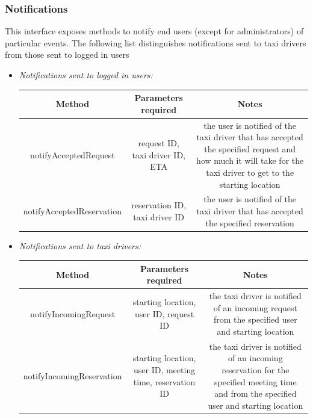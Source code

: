\documentclass{article}
\begin{document}
\begin{itemize}
\subsubsection{Notifications}
This interface exposes methods to notify end users (except for administrators) of particular events. 
The following list distinguishes notifications sent to taxi drivers from those sent to logged in users
\begin{itemize}
	\item \textit{Notifications sent to logged in users:} \\
		\begin{adjustbox}{width=1.2\textwidth}	
			\begin{tabular}{*{3}{c}}
				\toprule
				Method & Parameters required & Notes \\
				\midrule
				notifyAcceptedRequest & request ID, taxi driver ID, ETA & the user is notified of the taxi driver that has accepted the specified request and how much it will take for the taxi driver to get to the starting location\\ 
				notifyAcceptedReservation & reservation ID, taxi driver ID & the user is notified of the taxi driver that has accepted the specified reservation \\
				\bottomrule
			\end{tabular}
		\end{adjustbox}	
	\item \textit{Notifications sent to taxi drivers:} \\
		\begin{adjustbox}{width=1.2\textwidth}	
			\begin{tabular}{*{3}{c}}
				\toprule
				Method & Parameters required & Notes \\
				\midrule
				notifyIncomingRequest & starting location, user ID, request ID & the taxi driver is notified of an incoming request from the specified user and starting location\\ 
				notifyIncomingReservation & starting location, user ID, meeting time, reservation ID & the taxi driver is notified of an incoming reservation for the specified meeting time and from the specified user and starting location \\
				\bottomrule
			\end{tabular}
		\end{adjustbox}	
\end{itemize}		
\end{itemize}
\end{document}
